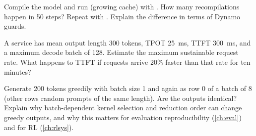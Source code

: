 \begin{exercise}
Compile the model and run  (growing cache) with
. How many recompilations happen in 50 steps? Repeat with
. Explain the difference in terms of Dynamo guards.
\end{exercise}

\begin{exercise}
A service has mean output length 300 tokens, TPOT \SI{25}{ms}, TTFT \SI{300}{ms}, and a maximum decode batch of
128. Estimate the maximum sustainable request rate. What happens to TTFT if requests arrive 20\%
faster than that rate for ten minutes?
\end{exercise}

\begin{exercise}[Determinism]
Generate 200 tokens greedily with batch size 1 and again as row 0 of a batch of 8 (other rows
random prompts of the same length). Are the outputs identical? Explain why batch-dependent kernel
selection and reduction order can change greedy outputs, and why this matters for evaluation
reproducibility (\cref{ch:eval}) and for RL (\cref{ch:rlsys}).
\end{exercise}

